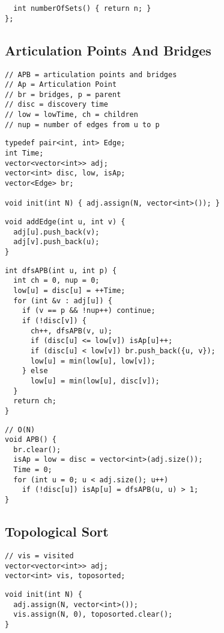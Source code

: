 \documentclass[twoside]{article}
\newcommand{\fileTitleStyle}{\raggedleft\underline}
\begin{document}
\begin{multicols*}{2}
\begin{verbatim}
  int numberOfSets() { return n; }
};
\end{verbatim}

\subsectionfont{\fileTitleStyle}
\subsection*{Articulation Points And Bridges}
\begin{verbatim}
// APB = articulation points and bridges
// Ap = Articulation Point
// br = bridges, p = parent
// disc = discovery time
// low = lowTime, ch = children
// nup = number of edges from u to p
\end{verbatim}
\vspace{-12pt}
\begin{verbatim}
typedef pair<int, int> Edge;
int Time;
vector<vector<int>> adj;
vector<int> disc, low, isAp;
vector<Edge> br;

void init(int N) { adj.assign(N, vector<int>()); }
\end{verbatim}
\vspace{-12pt}
\begin{verbatim}
void addEdge(int u, int v) {
  adj[u].push_back(v);
  adj[v].push_back(u);
}
\end{verbatim}
\vspace{-12pt}
\begin{verbatim}
int dfsAPB(int u, int p) {
  int ch = 0, nup = 0;
  low[u] = disc[u] = ++Time;
  for (int &v : adj[u]) {
    if (v == p && !nup++) continue;
    if (!disc[v]) {
      ch++, dfsAPB(v, u);
      if (disc[u] <= low[v]) isAp[u]++;
      if (disc[u] < low[v]) br.push_back({u, v});
      low[u] = min(low[u], low[v]);
    } else
      low[u] = min(low[u], disc[v]);
  }
  return ch;
}
\end{verbatim}
\vspace{-12pt}
\begin{verbatim}
// O(N)
void APB() {
  br.clear();
  isAp = low = disc = vector<int>(adj.size());
  Time = 0;
  for (int u = 0; u < adj.size(); u++)
    if (!disc[u]) isAp[u] = dfsAPB(u, u) > 1;
}
\end{verbatim}

\subsectionfont{\fileTitleStyle}
\subsection*{Topological Sort}
\begin{verbatim}
// vis = visited
vector<vector<int>> adj;
vector<int> vis, toposorted;
\end{verbatim}
\vspace{-12pt}
\begin{verbatim}
void init(int N) {
  adj.assign(N, vector<int>());
  vis.assign(N, 0), toposorted.clear();
}


\end{verbatim}
\end{multicols*}
\end{document}

